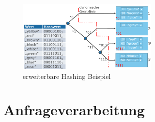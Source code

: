 \documentclass[a4paper]{article}
\begin{document}
    \begin{figure} [htp]
        \centering
        \includegraphics[width=7cm]{images/erweiterbaresHashing.png}
        \caption{erweiterbare Hashing Beispiel}
        \label{fig:erweiterbaresHashing}
    \end{figure}

\section{Anfrageverarbeitung}
\end{document}
